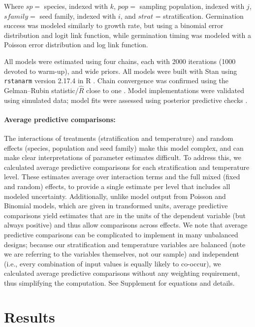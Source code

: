\documentclass[11pt]{article}\usepackage[]{graphicx}\usepackage[]{color}
\begin{document}
	 Where $sp = $ species, indexed with $k$, $pop =$ sampling population, indexed with $j$, $sfamily =$ seed family, indexed with $i$, and $strat$ = stratification. Germination success was modeled similarly to growth rate, but using a binomial error distribution and logit link function, while germination timing was modeled with a Poisson error distribution and log link function. 


	All models were estimated using four chains, each with 2000 iterations (1000 devoted to warm-up), and wide priors. All models were built with Stan \parencite{Carpenter2017} using \texttt{rstanarm} version 2.17.4 \parencite{Goodrich2018} in R \parencite{Team2015}. Chain convergence was confirmed using the Gelman--Rubin statistic/$\hat{R}$ close to one \parencite{Gelman1992}. Model implementations were validated using simulated data; model fits were assessed using posterior predictive checks \parencite{Gelman2004}.  
	
	\paragraph{Average predictive comparisons:} The interactions of treatments (stratification and temperature) and random effects (species, population and seed family) make this model complex, and can make clear interpretations of parameter estimates difficult. To address this, we calculated average predictive comparisons \parencite{Gelman2007} for each stratification and  temperature level. These estimates average over interaction terms and the full mixed (fixed and random) effects, to provide a single estimate per level that includes all modeled uncertainty. Additionally, unlike model output from Poisson and Binomial models, which are given in transformed units, average predictive comparisons yield estimates that are in the units of the dependent variable (but always positive) \parencite{Gelman2007} and thus allow comparisons across effects. We note that average predictive comparisons can be complicated to implement in many unbalanced designs; because our stratification and temperature variables are balanced (note we are referring to the variables themselves, not our sample) and independent (i.e., every combination of input values is equally likely to co-occur), we calculated average predictive comparisons without any weighting requirement, thus simplifying the computation. See Supplement for equations and details.

	\section{Results} 
\end{document}
